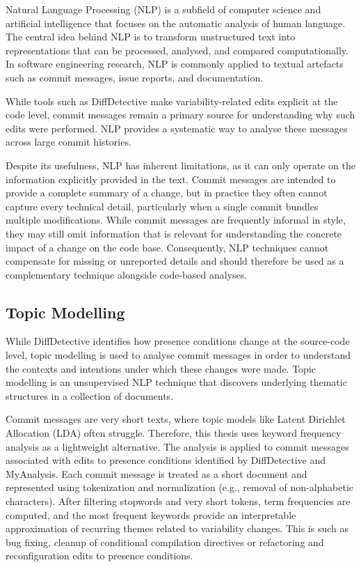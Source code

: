 Natural Language Processing (NLP) is a subfield of computer science and artificial intelligence that focuses on the automatic analysis of human language. The central idea behind NLP is to transform unstructured text into representations that can be processed, analysed, and compared computationally. In software engineering research, NLP is commonly applied to textual artefacts such as commit messages, issue reports, and documentation.

While tools such as DiffDetective make variability-related edits explicit at the code level, commit messages remain a primary source for understanding why such edits were performed. NLP provides a systematic way to analyse these messages across large commit histories.

Despite its usefulness, NLP has inherent limitations, as it can only operate on the information explicitly provided in the text. Commit messages are intended to provide a complete summary of a change, but in practice they often cannot capture every technical detail, particularly when a single commit bundles multiple modifications. While commit messages are frequently informal in style, they may still omit information that is relevant for understanding the concrete impact of a change on the code base. Consequently, NLP techniques cannot compensate for missing or unreported details and should therefore be used as a complementary technique alongside code-based analyses.


\subsection{Topic Modelling}
While DiffDetective identifies how presence conditions change at the source-code level, topic modelling is used to analyse commit messages in order to understand the contexts and intentions under which these changes were made. Topic modelling is an unsupervised NLP technique that discovers underlying thematic structures in a collection of documents.

Commit messages are very short texts, where topic models like Latent Dirichlet Allocation (LDA) often struggle. Therefore, this thesis uses keyword frequency analysis as a lightweight alternative. The analysis is applied to commit messages associated with edits to presence conditions identified by DiffDetective and MyAnalysis. Each commit message is treated as a short document and represented using tokenization and normalization (e.g., removal of non-alphabetic characters). After filtering stopwords and very short tokens, term frequencies are computed, and the most frequent keywords provide an interpretable approximation of recurring themes related to variability changes. This is such as bug fixing, cleanup of conditional compilation directives or refactoring and reconfiguration edits to presence conditions.

